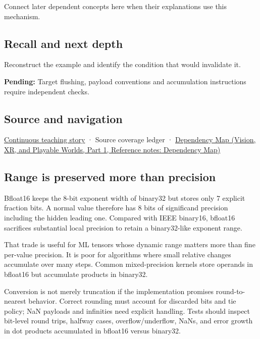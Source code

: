 Connect later dependent concepts here when their explanations use this mechanism.

\subsection{Recall and next depth}\label{appendix-18b8dd966b5d-recall-and-next-depth}

\hypertarget{appendix-18b8dd966b5d-recall-and-next-depth}{}

Reconstruct the example and identify the condition that would invalidate it.

\textbf{Pending:} Target flushing, payload conventions and accumulation instructions require independent checks.

\subsection{Source and navigation}\label{appendix-18b8dd966b5d-source-and-navigation}

\hypertarget{appendix-18b8dd966b5d-source-and-navigation}{}

\hyperref[01-foundations-i-ch001-choosing-what-information-to-keep]{Continuous teaching story} · {Source coverage ledger} · \href{../07-Vision-XR-and-Playable-Worlds-P01/main.pdf\#appendix-4ad47bdd269a}{Dependency Map (Vision, XR, and Playable Worlds, Part 1, Reference notes: Dependency Map)}

\subsection{Range is preserved more than precision}\label{appendix-18b8dd966b5d-range-is-preserved-more-than-precision}

\hypertarget{appendix-18b8dd966b5d-range-is-preserved-more-than-precision}{}

Bfloat16 keeps the 8-bit exponent width of binary32 but stores only 7 explicit fraction bits. A normal value therefore has 8 bits of significand precision including the hidden leading one. Compared with IEEE binary16, bfloat16 sacrifices substantial local precision to retain a binary32-like exponent range.

That trade is useful for ML tensors whose dynamic range matters more than fine per-value precision. It is poor for algorithms where small relative changes accumulate over many steps. Common mixed-precision kernels store operands in bfloat16 but accumulate products in binary32.

Conversion is not merely truncation if the implementation promises round-to-nearest behavior. Correct rounding must account for discarded bits and tie policy; NaN payloads and infinities need explicit handling. Tests should inspect bit-level round trips, halfway cases, overflow/underflow, NaNs, and error growth in dot products accumulated in bfloat16 versus binary32.
